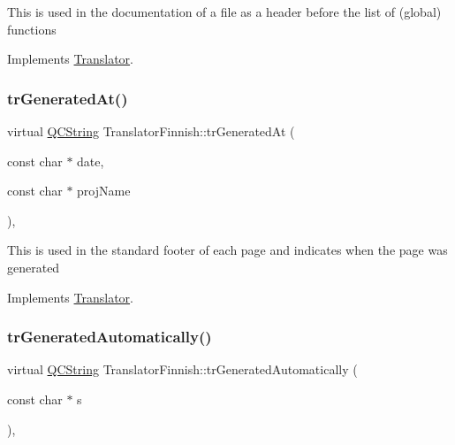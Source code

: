 This is used in the documentation of a file as a header before the list of (global) functions 

Implements \mbox{\hyperlink{class_translator}{Translator}}.

\mbox{\label{class_translator_finnish_a9215e191abac64d0134faa45fa04d5b4}} 
\subsubsection{\texorpdfstring{trGeneratedAt()}{trGeneratedAt()}}
{\footnotesize\ttfamily virtual \mbox{\hyperlink{class_q_c_string}{Q\+C\+String}} Translator\+Finnish\+::tr\+Generated\+At (\begin{DoxyParamCaption}\item[{const char $\ast$}]{date,  }\item[{const char $\ast$}]{proj\+Name }\end{DoxyParamCaption})\hspace{0.3cm}{\ttfamily [inline]}, {\ttfamily [virtual]}}

This is used in the standard footer of each page and indicates when the page was generated 

Implements \mbox{\hyperlink{class_translator}{Translator}}.

\mbox{\label{class_translator_finnish_aa3121e8476fea7aa2d58c21e53ca2cd9}} 
\subsubsection{\texorpdfstring{trGeneratedAutomatically()}{trGeneratedAutomatically()}}
{\footnotesize\ttfamily virtual \mbox{\hyperlink{class_q_c_string}{Q\+C\+String}} Translator\+Finnish\+::tr\+Generated\+Automatically (\begin{DoxyParamCaption}\item[{const char $\ast$}]{s }\end{DoxyParamCaption})\hspace{0.3cm}{\ttfamily [inline]}, {\ttfamily [virtual]}}

